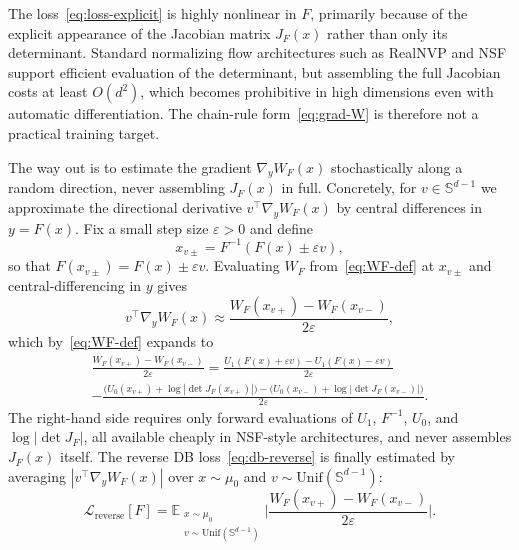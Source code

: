 \documentclass{article}
\theoremstyle{plain}
\begin{document}
The loss~\eqref{eq:loss-explicit} is highly nonlinear in $F$, primarily because of the explicit appearance of the Jacobian matrix $J_F(x)$ rather than only its determinant. Standard normalizing flow architectures such as RealNVP and NSF support efficient evaluation of the determinant, but assembling the full Jacobian costs at least $O(d^2)$, which becomes prohibitive in high dimensions even with automatic differentiation. The chain-rule form~\eqref{eq:grad-W} is therefore not a practical training target.

The way out is to estimate the gradient $\nabla_y W_F(x)$ stochastically along a random direction, never assembling $J_F(x)$ in full. Concretely, for $v \in \mathbb S^{d-1}$ we approximate the directional derivative $v^\top \nabla_y W_F(x)$ by central differences in $y = F(x)$. Fix a small step size $\varepsilon > 0$ and define
\begin{equation}\label{eq:xpm-reverse}
    x_{v\pm} = F^{-1}(F(x) \pm \varepsilon v),
\end{equation}
so that $F(x_{v\pm}) = F(x) \pm \varepsilon v$. Evaluating $W_F$ from~\eqref{eq:WF-def} at $x_{v\pm}$ and central-differencing in $y$ gives
\begin{equation}\label{eq:fd-reverse}
    v^\top \nabla_y W_F(x) \approx \frac{W_F(x_{v+}) - W_F(x_{v-})}{2\varepsilon},
\end{equation}
which by~\eqref{eq:WF-def} expands to
\begin{multline}\label{eq:fd-reverse-explicit}
    \frac{W_F(x_{v+}) - W_F(x_{v-})}{2\varepsilon} = \frac{U_1(F(x) + \varepsilon v) - U_1(F(x) - \varepsilon v)}{2\varepsilon} \\
    - \frac{\bigl(U_0(x_{v+}) + \log|\det J_F(x_{v+})|\bigr) - \bigl(U_0(x_{v-}) + \log|\det J_F(x_{v-})|\bigr)}{2\varepsilon}.
\end{multline}
The right-hand side requires only forward evaluations of $U_1$, $F^{-1}$, $U_0$, and $\log|\det J_F|$, all available cheaply in NSF-style architectures, and never assembles $J_F(x)$ itself. The reverse DB loss~\eqref{eq:db-reverse} is finally estimated by averaging $|v^\top \nabla_y W_F(x)|$ over $x \sim \mu_0$ and $v \sim \mathrm{Unif}(\mathbb S^{d-1})$:
\begin{equation}\label{eq:loss-reverse}
    \mathcal L_{\mathrm{reverse}}[F] = \mathbb E_{\substack{x \sim \mu_0 \\ v \sim \mathrm{Unif}(\mathbb S^{d-1})}} \biggl|\frac{W_F(x_{v+}) - W_F(x_{v-})}{2\varepsilon}\biggr|.
\end{equation}
\end{document}
